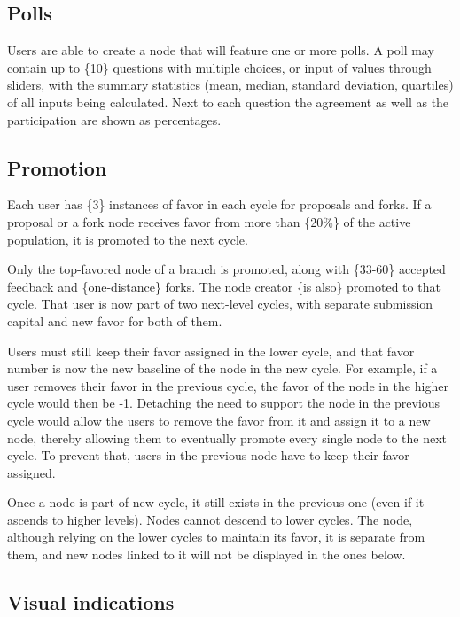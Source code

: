 \documentclass[a4paper,11pt]{article}
\begin{document}
\begin{multicols}{2}
\subsection{Polls} \label{polls}

Users are able to create a node that will feature one or more polls. A poll may contain up to \{10\} questions with multiple choices, or input of values through sliders, with the summary statistics (mean, median, standard deviation, quartiles) of all inputs being calculated. Next to each question the agreement as well as the participation are shown as percentages.

\subsection{Promotion} \label{promotion}

Each user has \{3\} instances of favor in each cycle for proposals and forks. If a proposal or a fork node receives favor from more than \{20\%\} of the active population, it is promoted to the next cycle.

Only the top-favored node of a branch is promoted, along with \{33-60\} accepted feedback and \{one-distance\} forks. The node creator \{is also\} promoted to that cycle. That user is now part of two next-level cycles, with separate submission capital and new favor for both of them.

Users must still keep their favor assigned in the lower cycle, and that favor number is now the new baseline of the node in the new cycle. For example, if a user removes their favor in the previous cycle, the favor of the node in the higher cycle would then be -1. Detaching the need to support the node in the previous cycle would allow the users to remove the favor from it and assign it to a new node, thereby allowing them to eventually promote every single node to the next cycle. To prevent that, users in the previous node have to keep their favor assigned.

Once a node is part of new cycle, it still exists in the previous one (even if it ascends to higher levels). Nodes cannot descend to lower cycles. The node, although relying on the lower cycles to maintain its favor, it is separate from them, and new nodes linked to it will not be displayed in the ones below.

\subsection{Visual indications} \label{visual}


\end{multicols}
\end{document}
